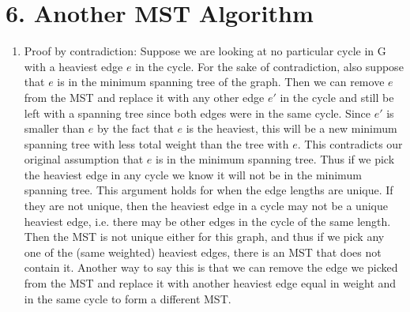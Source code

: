\documentclass[11pt]{article}
\newenvironment{qparts}{\begin{enumerate}[{(}a{)}]}{\end{enumerate}}
\begin{document}
\newpage
\section*{6. Another MST Algorithm}
\begin{qparts}
\item
Proof by contradiction: Suppose we are looking at no particular cycle in G with a heaviest edge $e$ in the cycle. For the sake of contradiction, also suppose that $e$ is in the minimum spanning tree of the graph. Then we can remove $e$ from the MST and replace it with any other edge $e'$ in the cycle and still be left with a spanning tree since both edges were in the same cycle. Since $e'$ is smaller than $e$ by the fact that $e$ is the heaviest, this will be a new minimum spanning tree with less total weight than the tree with $e$. This contradicts our original assumption that $e$ is in the minimum spanning tree. Thus if we pick the heaviest edge in any cycle we know it will not be in the minimum spanning tree. This argument holds for when the edge lengths are unique. If they are not unique, then the heaviest edge in a cycle may not be a unique heaviest edge, i.e. there may be other edges in the cycle of the same length. Then the MST is not unique either for this graph, and thus if we pick any one of the (same weighted) heaviest edges, there is an MST that does not contain it. Another way to say this is that we can remove the edge we picked from the MST and replace it with another heaviest edge equal in weight and in the same cycle to form a different MST.


\end{qparts}
\end{document}
